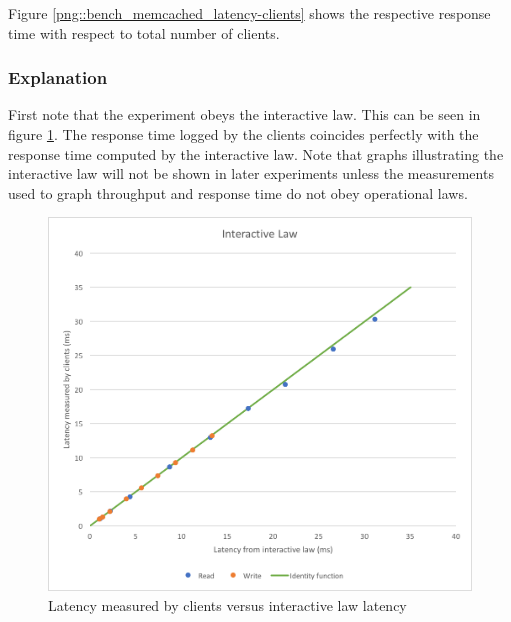 \documentclass[11pt,a4paper]{article}
\begin{document}
Figure \ref{png::bench_memcached_latency-clients} shows the respective response time with respect to total number of clients.



\subsubsection{Explanation\label{section::computation_reads}}
First note that the experiment obeys the interactive law. This can be seen in figure \ref{png::bench_memcached_inter_law}. The response time logged by the clients coincides perfectly with the response time computed by the interactive law. Note that graphs illustrating the interactive law will not be shown in later experiments unless the measurements used to graph throughput and response time do not obey operational laws.
\begin{figure}[!h]
    \centering
    \begin{minipage}[b]{.45\textwidth}
        \centering
        \includegraphics[width=\textwidth]{processing/graphics/bench_memcached_inter_law.png}
        \caption{Latency measured by clients versus interactive law latency}
        \label{png::bench_memcached_inter_law}
    \end{minipage}
    \qquad
    \begin{minipage}[b]{.45\textwidth}
        \centering

\end{minipage}
\end{figure}
\end{document}
